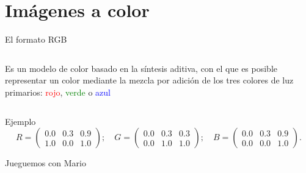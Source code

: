 \section{Imágenes a color}


\begin{frame}{El formato RGB}

    \begin{columns}
    \column{8cm}
        Es un modelo de color basado en la síntesis aditiva, con el que es posible representar un color mediante la mezcla por adición de los tres colores de luz primarios: \textcolor{red}{rojo}, \textcolor{green}{verde} o \textcolor{blue}{azul}
    \column{5cm}
    \end{columns}

\end{frame}


\begin{frame}{Ejemplo}
    \[
        R = \begin{pmatrix}
            0.0& 0.3& 0.9\\
            1.0& 0.0& 1.0
        \end{pmatrix};\quad
        G = \begin{pmatrix}
            0.0& 0.3& 0.3\\
            0.0& 1.0& 1.0
        \end{pmatrix};\quad
        B = \begin{pmatrix}
            0.0& 0.3& 0.9\\
            0.0& 0.0& 1.0
        \end{pmatrix}.
    \]
    \pause  
    \begin{center}
    \end{center}

\end{frame}

\begin{frame}{Jueguemos con Mario}
    
    \begin{center}
    \end{center}

\end{frame}
